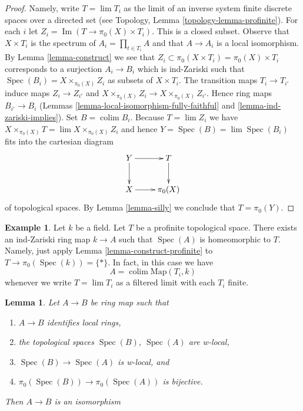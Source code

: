 \documentclass{stacks-project}
\theoremstyle{plain}
\newtheorem{lemma}[subsection]{Lemma}
\theoremstyle{definition}
\newtheorem{example}[subsection]{Example}
\theoremstyle{remark}
\numberwithin{equation}{subsection}
\def\lim{\mathop{\mathrm{lim}}\nolimits}
\def\colim{\mathop{\mathrm{colim}}\nolimits}
\def\Spec{\mathop{\mathrm{Spec}}}
\def\Im{\mathop{\mathrm{Im}}}
\begin{document}
\begin{proof}
Namely, write $T = \lim T_i$ as the limit of an inverse system finite
discrete spaces over a directed set (see
Topology, Lemma \ref{topology-lemma-profinite}). For each $i$ let
$Z_i = \Im(T \to \pi_0(X) \times T_i)$. This is a closed subset.
Observe that $X \times T_i$ is the spectrum of $A_i = \prod_{t \in T_i} A$
and that $A \to A_i$ is a local isomorphism. By Lemma \ref{lemma-construct}
we see that $Z_i \subset \pi_0(X \times T_i) = \pi_0(X) \times T_i$
corresponds to a surjection $A_i \to B_i$ which is ind-Zariski
such that $\Spec(B_i) = X \times_{\pi_0(X)} Z_i$ as subsets of
$X \times T_i$. The transition maps $T_i \to T_{i'}$ induce maps
$Z_i \to Z_{i'}$ and $X \times_{\pi_0(X)} Z_i \to X \times_{\pi_0(X)} Z_{i'}$.
Hence ring maps $B_{i'} \to B_i$
(Lemmas \ref{lemma-local-isomorphism-fully-faithful} and
\ref{lemma-ind-zariski-implies}).
Set $B = \colim B_i$. Because $T = \lim Z_i$ we have
$X \times_{\pi_0(X)} T = \lim  X \times_{\pi_0(X)} Z_i$
and hence $Y = \Spec(B) = \lim \Spec(B_i)$
fits into the cartesian diagram
$$
\xymatrix{
Y \ar[r] \ar[d] & T \ar[d] \\
X \ar[r] & \pi_0(X)
}
$$
of topological spaces. By Lemma \ref{lemma-silly}
we conclude that $T = \pi_0(Y)$.
\end{proof}

\begin{example}
\label{example-construct-space}
Let $k$ be a field. Let $T$ be a profinite topological space.
There exists an ind-Zariski ring map $k \to A$ such that
$\Spec(A)$ is homeomorphic to $T$. Namely, just apply
Lemma \ref{lemma-construct-profinite} to $T \to \pi_0(\Spec(k)) = \{*\}$.
In fact, in this case we have
$$
A = \colim \text{Map}(T_i, k)
$$
whenever we write $T = \lim T_i$ as a filtered limit with each $T_i$ finite.
\end{example}

\begin{lemma}
\label{lemma-w-local-morphism-equal-points-stalks-is-iso}
Let $A \to B$ be ring map such that
\begin{enumerate}
\item $A \to B$ identifies local rings,
\item the topological spaces $\Spec(B)$, $\Spec(A)$ are w-local,
\item $\Spec(B) \to \Spec(A)$ is w-local, and
\item $\pi_0(\Spec(B)) \to \pi_0(\Spec(A))$ is bijective.
\end{enumerate}
Then $A \to B$ is an isomorphism
\end{lemma}
\end{document}
